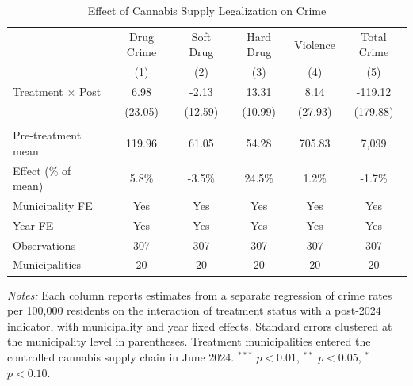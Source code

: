 \begin{table}[t]
\centering
\caption{Effect of Cannabis Supply Legalization on Crime}
\label{tab:main}
\begin{tabular}{lccccc}
\hline\hline
 & Drug Crime & Soft Drug & Hard Drug & Violence & Total Crime \\
 & (1) & (2) & (3) & (4) & (5) \\
\hline
Treatment $\times$ Post & 6.98 & -2.13 & 13.31 & 8.14 & -119.12 \\
 & (23.05) & (12.59) & (10.99) & (27.93) & (179.88) \\
 & & & & & \\
Pre-treatment mean & 119.96 & 61.05 & 54.28 & 705.83 & 7,099 \\
Effect (\% of mean) & 5.8\% & -3.5\% & 24.5\% & 1.2\% & -1.7\% \\
Municipality FE & Yes & Yes & Yes & Yes & Yes \\
Year FE & Yes & Yes & Yes & Yes & Yes \\
Observations & 307 & 307 & 307 & 307 & 307 \\
Municipalities & 20 & 20 & 20 & 20 & 20 \\
\hline\hline
\end{tabular}
\begin{tablenotes}
\item \textit{Notes:} Each column reports estimates from a separate regression of crime rates per 100,000 residents on the interaction of treatment status with a post-2024 indicator, with municipality and year fixed effects. Standard errors clustered at the municipality level in parentheses. Treatment municipalities entered the controlled cannabis supply chain in June 2024. $^{***}$ $p<0.01$, $^{**}$ $p<0.05$, $^{*}$ $p<0.10$.
\end{tablenotes}
\end{table}

